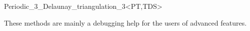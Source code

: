 \begin{ccRefClass}{Periodic_3_Delaunay_triangulation_3<PT,TDS>}
\begin{ccAdvanced}
These methods are  mainly a debugging help for the users of advanced features.
\end{ccAdvanced}

\ccSeeAlso




\end{ccRefClass}
